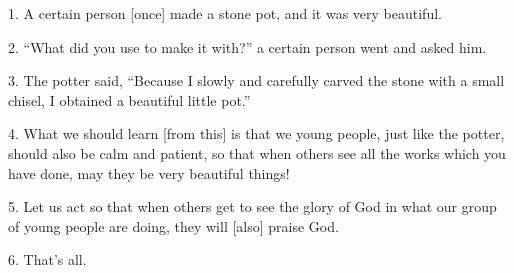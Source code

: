 \setcounter{footnote}{0}

1. A certain person [once] made a stone pot, and it was very beautiful.

2. ``What did you use to make it with?'' a certain person went and asked him.

3. The potter said, ``Because I slowly and carefully carved the stone with a small
chisel, I obtained a beautiful little pot.''

4. What we should learn [from this] is that we young people, just like the potter,
should also be calm and patient, so that when others see all the works which you
have done, may they be very beautiful things!

5. Let us act so that when others get to see the glory of God in what our group
of young people are doing, they will [also] praise God.

6. That's all.

